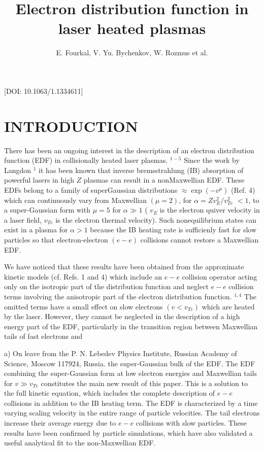 \documentclass[oneside,onecolumn]{article}
\date{}
\title{Electron distribution function in laser heated plasmas }
\author{E. Fourkal,  V. Yu. Bychenkov,   W. Rozmus et al.}
\begin{document}
 \begin{sloppypar}
 
 \maketitle
 
 
 
 [DOI: 10.1063/1.1334611]
 
 \section{INTRODUCTION}
 There has been an ongoing interest in the description of an electron distribution function (EDF) in collisionally heated laser plasmas. ${ }^{1-5}$ Since the work by Langdon ${ }^{1}$ it has been known that inverse bremsstrahlung (IB) absorption of powerful lasers in high $Z$ plasmas can result in a nonMaxwellian EDF. These EDFs belong to a family of superGaussian distributions $\approx \exp \left(-v^{\mu}\right)$ (Ref. 4) which can continuously vary from Maxwellian $(\mu=2)$, for $\alpha=Z v_{E}^{2} / v_{T e}^{2}$ $<1$, to a super-Gaussian form with $\mu=5$ for $\alpha \gg 1$ ( $v_{E}$ is the electron quiver velocity in a laser field, $v_{T e}$ is the electron thermal velocity). Such nonequilibrium states can exist in a plasma for $\alpha>1$ because the IB heating rate is sufficienly fast for slow particles so that electron-electron $(e-e)$ collisions cannot restore a Maxwellian EDF.
 
 We have noticed that these results have been obtained from the approximate kinetic models (cf. Refs. 1 and 4) which include an $e-e$ collision operator acting only on the isotropic part of the distribution function and neglect $e-e$ collision terms involving the anisotropic part of the electron distribution function. ${ }^{1,4}$ The omitted terms have a small effect on slow electrons $\left(v<v_{T e}\right)$ which are heated by the laser. However, they cannot be neglected in the description of a high energy part of the EDF, particularly in the transition region between Maxwellian tails of fast electrons and
 
 a) On leave from the P. N. Lebedev Physics Institute, Russian Academy of Science, Moscow 117924, Russia. the super-Gaussian bulk of the EDF. The EDF combining the super-Gaussian form at low electron energies and Maxwellian tails for $v \gg v_{T e}$ constitutes the main new result of this paper. This is a solution to the full kinetic equation, which includes the complete description of $e-e$ collisions in addition to the IB heating term. The EDF is characterized by a time varying scaling velocity in the entire range of particle velocities. The tail electrons increase their average energy due to $e-e$ collisions with slow particles. These results have been confirmed by particle simulations, which have also validated a useful analytical fit to the non-Maxwellian EDF.
 

\end{sloppypar}
\end{document}
